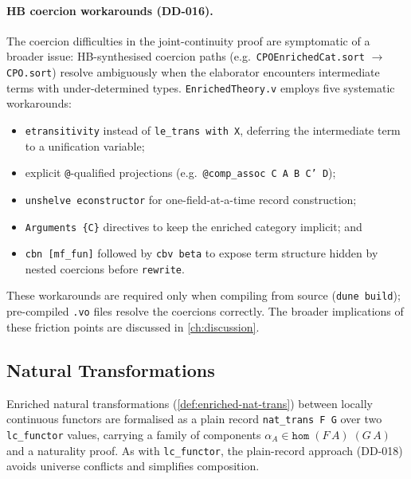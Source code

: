 \paragraph{HB coercion workarounds (DD-016).}
The coercion difficulties in the joint-continuity proof are symptomatic
of a broader issue: HB-synthesised coercion paths
(e.g.\ \texttt{CPOEnrichedCat.sort} $\to$ \texttt{CPO.sort}) resolve
ambiguously when the elaborator encounters intermediate terms with
under-determined types.  \texttt{EnrichedTheory.v} employs five
systematic workarounds:
\begin{itemize}
  \item \texttt{etransitivity} instead of \texttt{le\_trans with X},
    deferring the intermediate term to a unification variable;
  \item explicit \texttt{@}-qualified projections
    (e.g.\ \texttt{@comp\_assoc C A B C' D});
  \item \texttt{unshelve econstructor} for one-field-at-a-time record
    construction;
  \item \texttt{Arguments \{C\}} directives to keep the enriched
    category implicit; and
  \item \texttt{cbn [mf\_fun]} followed by \texttt{cbv beta} to expose
    term structure hidden by nested coercions before \texttt{rewrite}.
\end{itemize}
These workarounds are required only when compiling from source
(\texttt{dune build}); pre-compiled \texttt{.vo} files resolve the
coercions correctly.  The broader implications of these friction
points are discussed in \cref{ch:discussion}.

\subsection{Natural Transformations}
\label{sec:meth-nat-trans}


Enriched natural transformations (\cref{def:enriched-nat-trans}) between
locally continuous functors are formalised as a plain record
\texttt{nat\_trans~F~G} over two \texttt{lc\_functor} values, carrying
a family of components $\alpha_A \in \texttt{hom}\;(F\,A)\;(G\,A)$ and
a naturality proof.  As with \texttt{lc\_functor}, the plain-record
approach (DD-018) avoids universe conflicts and simplifies composition.

